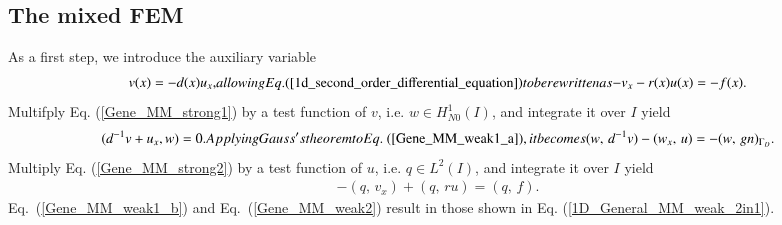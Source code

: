 \documentclass[review,3p]{elsarticle}
\begin{document}
\subsection{The mixed FEM}		\label{derivation_weak_form_MM}
As a first step, we introduce the auxiliary variable
\begin{subequations}
\begin{align}
   v(x) = - d(x)u_x, \label{Gene_MM_strong1} 
\end{align}  
allowing Eq. (\ref{1d_second_order_differential_equation}) to be rewritten as
\begin{align}
  -v_x - r(x)u(x) = -f(x).  \label{Gene_MM_strong2}
\end{align}	\label{1D_general_MM_2in1}%
\end{subequations}
Multifply Eq. (\ref{Gene_MM_strong1}) by a test function of $v$, i.e. $w \in H _{N0}^{1}(I)$, and integrate it over $I$ yield
\begin{subequations}
\begin{align}
  ( d^{-1}v + u _x, w) = 0.	\label{Gene_MM_weak1_a}
\end{align}
Applying Gauss's theorem to Eq.~(\ref{Gene_MM_weak1_a}), it becomes
\begin{align}
 (w, \, d^{-1}v) - (w_x, \,  u ) = -(w, \, g n)_{\Gamma_D}.		\label{Gene_MM_weak1_b}
\end{align}				\label{Gene_MM_weak1}%
\end{subequations}
Multiply Eq. (\ref{Gene_MM_strong2}) by a test function of $u$, i.e. $q \in L^2 (I)$, and integrate it over $I$ yield
\begin{align}
- ( q , \, v_x) + (q, \, ru) = (q, \, f ). \label{Gene_MM_weak2}
\end{align}
Eq.~(\ref{Gene_MM_weak1_b}) and Eq.~({\ref{Gene_MM_weak2}}) result in those shown in Eq. (\ref{1D_General_MM_weak_2in1}).

  
\end{document}
